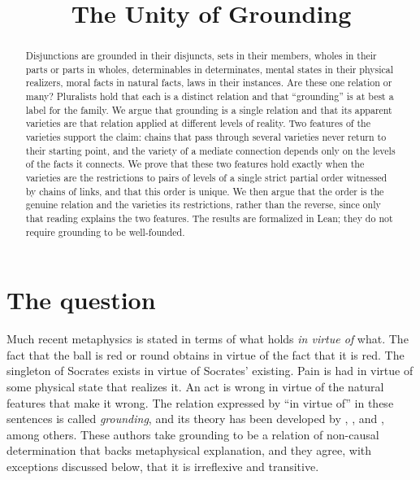 \documentclass{situationist-preprint}
\title{The Unity of Grounding}
\begin{document}
\maketitle

\begin{abstract}
Disjunctions are grounded in their disjuncts, sets in their members, wholes in their parts or parts in wholes, determinables in determinates, mental states in their physical realizers, moral facts in natural facts, laws in their instances. Are these one relation or many? Pluralists hold that each is a distinct relation and that \enquote{grounding} is at best a label for the family. We argue that grounding is a single relation and that its apparent varieties are that relation applied at different levels of reality. Two features of the varieties support the claim: chains that pass through several varieties never return to their starting point, and the variety of a mediate connection depends only on the levels of the facts it connects. We prove that these two features hold exactly when the varieties are the restrictions to pairs of levels of a single strict partial order witnessed by chains of links, and that this order is unique. We then argue that the order is the genuine relation and the varieties its restrictions, rather than the reverse, since only that reading explains the two features. The results are formalized in Lean; they do not require grounding to be well-founded.
\end{abstract}

\section{The question}\label{s:question}

Much recent metaphysics is stated in terms of what holds \emph{in virtue of} what. The fact that the ball is red or round obtains in virtue of the fact that it is red. The singleton of Socrates exists in virtue of Socrates' existing. Pain is had in virtue of some physical state that realizes it. An act is wrong in virtue of the natural features that make it wrong. The relation expressed by \enquote{in virtue of} in these sentences is called \emph{grounding}, and its theory has been developed by \citet{Fine2001,Fine2012}, \citet{Schaffer2009}, \citet{Rosen2010} and \citet{Audi2012}, among others. These authors take grounding to be a relation of non-causal determination that backs metaphysical explanation, and they agree, with exceptions discussed below, that it is irreflexive and transitive.
\end{document}
